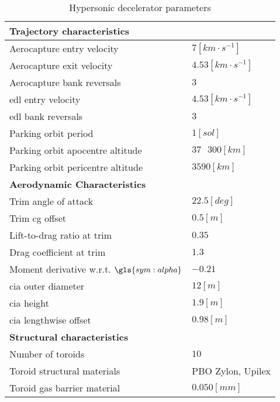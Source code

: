 \begin{table}[H]
	\centering
	\caption{Hypersonic decelerator parameters}
	\label{tab:DeceleratorPar}
	\begin{tabular}{|p{}|p{}|} \hline
		\textbf{Trajectory characteristics}             	& 			\\ \hline \hline
		Aerocapture entry velocity       				&	 $7 \left[km \cdot s^{-1}\right]$ 		\\ \hline
		Aerocapture exit velocity				 		&    $4.53 \left[km \cdot s^{-1}\right]$  	  	\\ \hline
		Aerocapture bank reversals				        &  	 $3$		\\ \hline
		\gls{edl} entry velocity					 	&  	 $4.53 \left[km \cdot s^{-1}\right]$	\\ \hline
		\gls{edl} bank reversals					 	&  	 $3$	\\ \hline
		Parking orbit period						 	&  	 $1 \left[sol\right]$		\\ \hline
		Parking orbit apocentre altitude			 				&  	$37\mbox{ }300 \left[km\right]$		\\ \hline
		Parking orbit pericentre altitude			 			&  	$3590 \left[km\right]$		\\ \hline
		\textbf{Aerodynamic Characteristics}			&			\\ \hline \hline
		Trim angle of attack				 			&  $22.5 \left[deg\right]$			\\ \hline
		Trim \gls{cg} offset							&  $0.5 \left[m\right]$		\\ \hline
		Lift-to-drag ratio at trim			 			&  	$0.35$	\\ \hline
		Drag coefficient at trim			 			&  	$1.3$	\\ \hline
		Moment derivative w.r.t. $\gls{sym:alpha}$		&  	$-0.21$		\\ \hline
		\gls{cia} outer diameter						&  	$12 \left[m\right]$		\\ \hline
		\gls{cia} height								&  	$1.9 \left[m\right]$		\\ \hline
		\gls{cia} lengthwise offset						&  	$0.98 \left[m\right]$		\\ \hline
		\textbf{Structural characteristics}				&			\\ \hline \hline
		Number of toroids					 			&   $10$			\\ \hline 
		Toroid structural materials						 			&  	PBO Zylon\textsuperscript{\textregistered}, Upilex		\\ \hline
		Toroid gas barrier material		&	$0.050 \left[mm\right]$		\\ \hline

\end{tabular}
\end{table}
